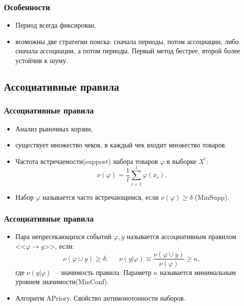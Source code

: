 \documentclass[smaller]{beamer}
\begin{document}
\begin{frame}
  \frametitle{Особенности}
  \begin{itemize}
   \item Период всегда фиксирован,
    \item возможны две стратегии поиска: сначала периоды, потом ассоциации, либо сначала ассоциации, а потом периоды. Первый метод бестрее, второй
	  более устойчив к шуму.
  \end{itemize}
\end{frame}


\subsection{Ассоциативные правила}
\begin{frame}
  \frametitle{Ассоциативные правила}
  \begin{itemize}
    \item Анализ рыночных корзин,
    \item существует множество чеков, в каждый чек входит множество товаров.
    \item Частота встречаемости(support) набора товаров $\varphi$ в выборке $X^l$:
    $$\nu(\varphi)=\frac1l\sum_{i=1}^l \varphi(x_i).$$
    \item Набор $\varphi$ называется часто встречающимся, если $\nu(\varphi)\geqslant\delta$ (MinSupp).
  \end{itemize}
\end{frame}

\begin{frame}
  \frametitle{Ассоциативные правила}
  \begin{itemize}
    \item Пара непресекающихся событий $\varphi, y$ называется ассоциативным правилом <<$\varphi\longrightarrow y$>>, если:
    $$\nu(\varphi\cup y)\geqslant\delta;~~~~~~~\nu(y|\varphi)\equiv\frac{\nu(\varphi\cup y)}{\nu(\varphi)}\geqslant\kappa,$$
    где $\nu(y|\varphi)$~-- значимость правила. Параметр $\kappa$ называется минимальным уровнем значимости(MinConf).
    \item Алгоритм APriory. Свойство антимонотонности наборов.
  \end{itemize}
\end{frame}
\end{document}
